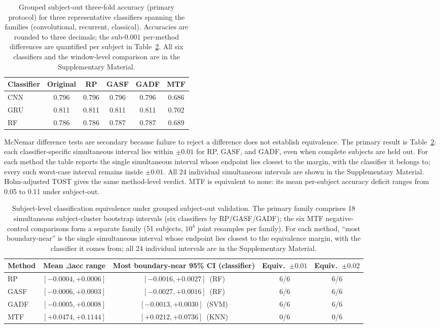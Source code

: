 \documentclass[5p]{elsarticle}
\begin{document}
\begin{table}[!htbp]
\centering
\caption{Grouped subject-out three-fold accuracy (primary protocol) for three representative classifiers spanning the families (convolutional, recurrent, classical). Accuracies are rounded to three decimals; the sub-$0.001$ per-method differences are quantified per subject in Table~\ref{tab:equivalence_ci}. All six classifiers and the window-level comparison are in the Supplementary Material.}\label{tab:subject_out_acc}
\begin{tabular}{lccccc}
\toprule
Classifier & Original & RP & GASF & GADF & MTF \\
\midrule
CNN & 0.796 & 0.796 & 0.796 & 0.796 & 0.686 \\
GRU & 0.811 & 0.811 & 0.811 & 0.811 & 0.702 \\
RF  & 0.786 & 0.786 & 0.787 & 0.787 & 0.689 \\
\bottomrule
\end{tabular}
\end{table}

McNemar difference tests are secondary because failure to reject a difference does not establish equivalence. The primary result is Table~\ref{tab:equivalence_ci}: each classifier-specific simultaneous interval lies within \(\pm0.01\) for RP, GASF, and GADF, even when complete subjects are held out. For each method the table reports the single simultaneous interval whose endpoint lies closest to the margin, with the classifier it belongs to; every such worst-case interval remains inside \(\pm0.01\). All 24 individual simultaneous intervals are shown in the Supplementary Material. Holm-adjusted TOST gives the same method-level verdict. MTF is equivalent to none: its mean per-subject accuracy deficit ranges from 0.05 to 0.11 under subject-out.

\begin{table}[!htbp]
\centering
\caption{Subject-level classification equivalence under grouped subject-out validation. The primary family comprises 18 simultaneous subject-cluster bootstrap intervals (six classifiers by RP/GASF/GADF); the six MTF negative-control comparisons form a separate family (51 subjects, \(10^4\) joint resamples per family). For each method, ``most boundary-near'' is the single simultaneous interval whose endpoint lies closest to the equivalence margin, with the classifier it comes from; all 24 individual intervals are in the Supplementary Material.}\label{tab:equivalence_ci}
\begin{tabular}{lcccc}
\toprule
Method & Mean \(\Delta\)acc range & Most boundary-near 95\% CI (classifier) & Equiv.\ \(\pm0.01\) & Equiv.\ \(\pm0.02\) \\
\midrule
RP   & \([-0.0004,+0.0006]\) & \([-0.0016,+0.0027]\)~(RF)  & 6/6 & 6/6 \\
GASF & \([-0.0006,+0.0003]\) & \([-0.0027,+0.0016]\)~(RF)  & 6/6 & 6/6 \\
GADF & \([-0.0005,+0.0008]\) & \([-0.0013,+0.0030]\)~(SVM) & 6/6 & 6/6 \\
MTF  & \([+0.0474,+0.1144]\) & \([+0.0212,+0.0736]\)~(KNN) & 0/6 & 0/6 \\
\bottomrule
\end{tabular}
\end{table}
\end{document}
